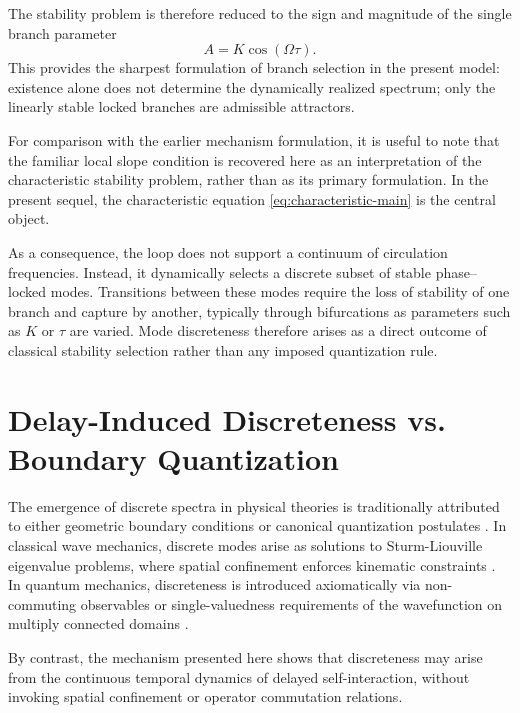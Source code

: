 \documentclass[11pt,a4paper]{article}
\begin{document}
        The stability problem is therefore reduced to the sign and magnitude of the single branch parameter
        \begin{equation}
            A=K\cos(\Omega\tau).
        \end{equation}
        This provides the sharpest formulation of branch selection in the present model: existence alone does not determine the dynamically realized spectrum; only the linearly stable locked branches are admissible attractors.

        For comparison with the earlier mechanism formulation, it is useful to note that the familiar local slope condition is recovered here as an interpretation of the characteristic stability problem, rather than as its primary formulation. In the present sequel, the characteristic equation \eqref{eq:characteristic-main} is the central object.
        
        As a consequence, the loop does not support a continuum of circulation frequencies. Instead, it dynamically selects a discrete subset of stable phase--locked modes. Transitions between these modes require the loss of stability of one branch and capture by another, typically through bifurcations as parameters such as $K$ or $\tau$ are varied. Mode discreteness therefore arises as a direct outcome of classical stability selection rather than any imposed quantization rule.

    \section{Delay-Induced Discreteness vs. Boundary Quantization}

        The emergence of discrete spectra in physical theories is traditionally attributed to either geometric boundary conditions or canonical quantization postulates \cite{Zettl2005,Griffiths2018}.
        In classical wave mechanics, discrete modes arise as solutions to Sturm-Liouville eigenvalue problems, where spatial confinement enforces kinematic constraints \cite{Zettl2005}.
        In quantum mechanics, discreteness is introduced axiomatically via non-commuting observables or single-valuedness requirements of the wavefunction on multiply connected domains \cite{Griffiths2018}.

        By contrast, the mechanism presented here shows that discreteness may arise from the continuous temporal dynamics of delayed self-interaction, without invoking spatial confinement or operator commutation relations.
\end{document}
